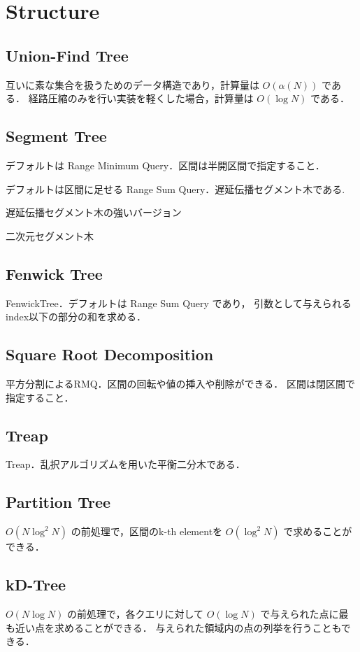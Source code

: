 \section{Structure}

\subsection{Union-Find Tree}
互いに素な集合を扱うためのデータ構造であり，計算量は $O(\alpha(N))$ である．
経路圧縮のみを行い実装を軽くした場合，計算量は $O(\log N)$ である．


\subsection{Segment Tree}
デフォルトは Range Minimum Query．区間は半開区間で指定すること．

デフォルトは区間に足せる Range Sum Query．遅延伝播セグメント木である.

遅延伝播セグメント木の強いバージョン

二次元セグメント木


\subsection{Fenwick Tree}
FenwickTree．デフォルトは Range Sum Query であり，
引数として与えられるindex以下の部分の和を求める．


\subsection{Square Root Decomposition}
平方分割によるRMQ．区間の回転や値の挿入や削除ができる．
区間は閉区間で指定すること．


\subsection{Treap}
Treap．乱択アルゴリズムを用いた平衡二分木である．


\subsection{Partition Tree}
$O(N \log^2 N)$ の前処理で，区間のk-th elementを $O(\log^2 N)$ で求めることができる．


\subsection{kD-Tree}
$O(N \log N)$ の前処理で，各クエリに対して $O(\log N)$ で与えられた点に最も近い点を求めることができる．
与えられた領域内の点の列挙を行うこともできる．


